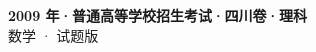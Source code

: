 \documentclass[zihao=-4, a4paper]{ctexart}
\begin{document}
\begin{center}
  {\Large\bfseries 2009 年·普通高等学校招生考试·四川卷·理科}\\[4pt]
  {\large 数学 · 试题版}
\end{center}
\medskip
{}

\end{document}

